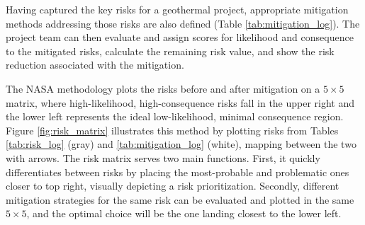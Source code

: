 Having captured the key risks for a geothermal project, appropriate mitigation methods addressing those risks are also defined (Table \ref{tab:mitigation_log}). The project team can then evaluate and assign scores for likelihood and consequence to the mitigated risks, calculate the remaining risk value, and show the risk reduction associated with the mitigation.

The NASA methodology plots the risks before and after mitigation on a $5\times5$ matrix, where high-likelihood, high-consequence risks fall in the upper right and the lower left represents the ideal low-likelihood, minimal consequence region. Figure \ref{fig:risk_matrix} illustrates this method by plotting risks from Tables \ref{tab:risk_log} (gray) and \ref{tab:mitigation_log} (white), mapping between the two with arrows. The risk matrix serves two main functions. First, it quickly differentiates between risks by placing the most-probable and problematic ones closer to top right, visually depicting a risk prioritization. Secondly, different mitigation strategies for the same risk can be evaluated and plotted in the same $5\times5$, and the optimal choice will be the one landing closest to the lower left.

